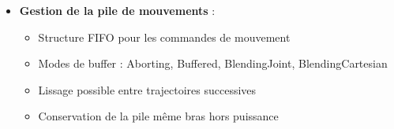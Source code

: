 \begin{itemize}
    \item \textbf{Gestion de la pile de mouvements} :
    \begin{itemize}
        \item Structure FIFO pour les commandes de mouvement
        \item Modes de buffer : Aborting, Buffered, BlendingJoint, BlendingCartesian
        \item Lissage possible entre trajectoires successives
        \item Conservation de la pile même bras hors puissance
    \end{itemize}
\end{itemize}